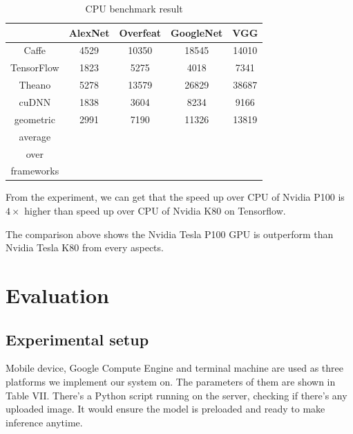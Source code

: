 \documentclass[conference]{IEEEtran}
\begin{document}
\begin{table}[H]
\caption{CPU benchmark result}
\begin{tabular}{|c|c|c|c|c|}
\hline
 & \textbf{AlexNet}& \textbf{Overfeat}& \textbf{GoogleNet} & \textbf{VGG}\\
\hline
Caffe & 4529 & 10350 & 18545 & 14010 \\
\hline
TensorFlow & 1823& 5275 & 4018 & 7341 \\
\hline
Theano & 5278& 13579 & 26829 & 38687 \\
\hline
cuDNN & 1838& 3604 & 8234 & 9166 \\
\hline
geometric & 2991& 7190 & 11326 & 13819 \\
average&&&&\\
over&&&&\\
frameworks&&&&\\
\hline
\end{tabular}
\label{tab4}
\end{table}

From the experiment, we can get that the speed up over CPU of Nvidia P100 is $4 \times$ higher than speed up over CPU of Nvidia K80 on Tensorflow. 

The comparison above shows the Nvidia Tesla P100 GPU is outperform than Nvidia Tesla K80 from every aspects. 

\section{Evaluation}

\subsection{Experimental setup}

Mobile device, Google Compute Engine and terminal machine are used as three platforms we implement our system on. The parameters of them are shown in Table VII. There's a Python script running on the server, checking if there's any uploaded image. It would ensure the model is preloaded and ready to make inference anytime. 
\end{document}
